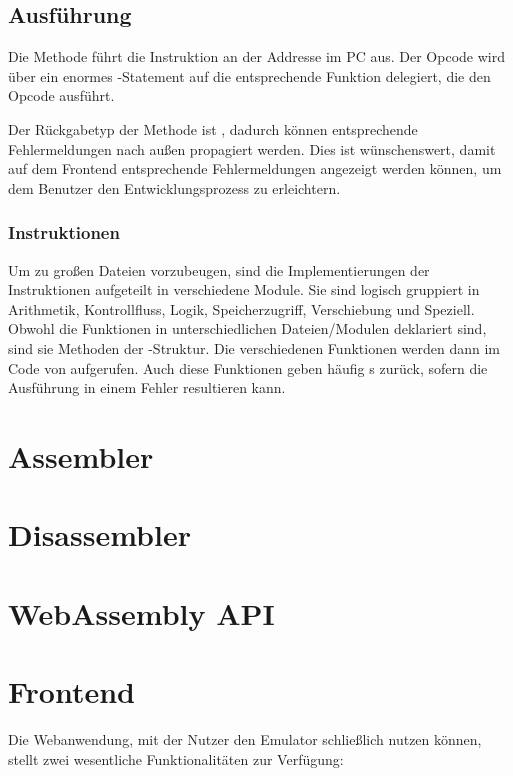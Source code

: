 \subsection{Ausführung}

Die  Methode führt die Instruktion an der Addresse im PC aus. Der Opcode wird über ein enormes -Statement auf die entsprechende Funktion delegiert, die den Opcode ausführt.

Der Rückgabetyp der Methode ist , dadurch können entsprechende Fehlermeldungen nach außen propagiert werden. Dies ist wünschenswert, damit auf dem Frontend entsprechende Fehlermeldungen angezeigt werden können, um dem Benutzer den Entwicklungsprozess zu erleichtern.

\subsubsection{Instruktionen}

Um zu großen Dateien vorzubeugen, sind die Implementierungen der Instruktionen aufgeteilt in verschiedene Module. Sie sind logisch gruppiert in Arithmetik, Kontrollfluss, Logik, Speicherzugriff, Verschiebung und Speziell.
Obwohl die Funktionen in unterschiedlichen Dateien/Modulen deklariert sind, sind sie Methoden der -Struktur.
Die verschiedenen Funktionen werden dann im Code von  aufgerufen.
Auch diese Funktionen geben häufig s zurück, sofern die Ausführung in einem Fehler resultieren kann.

\section{Assembler}

\section{Disassembler}

\section{WebAssembly API}

\section{Frontend}

Die Webanwendung, mit der Nutzer den Emulator schließlich nutzen können, stellt zwei wesentliche Funktionalitäten zur Verfügung:

